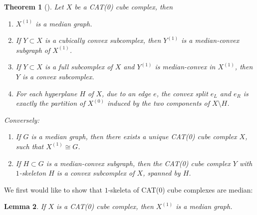 \documentclass[12pt, a4paper]{article}
\theoremstyle{plain}
\newtheorem{theorem}{Theorem}[section]
\newtheorem{lemma}[theorem]{Lemma}
\theoremstyle{definition}
\theoremstyle{remark}
\begin{document}
    \begin{theorem}[\cite{hagen}]
        Let $X$ be a CAT(0) cube complex, then
        
        \begin{enumerate}
            \item $X^{(1)}$ is a median graph.
            \item If $Y \subset X$ is a cubically convex subcomplex, then $Y^{(1)}$ is a median-convex subgraph of $X^{(1)}$.
            \item If $Y \subset X$ is a full subcomplex of $X$ and $Y^{(1)}$ is median-convex in $X^{(1)}$, then $Y$ is a convex subcomplex.
            \item For each hyperplane $H$ of $X$, due to an edge $e$, the convex split $e_{L}$ and $e_{R}$ is exactly the partition of $X^{(0)}$ induced by the two components of $X \setminus H$.
        \end{enumerate}
        
        Conversely:
        
        \begin{enumerate}
            \item If $G$ is a median graph, then there exists a unique CAT(0) cube complex $X$, such that $X^{(1)} \cong G$.
            \item If $H \subset G$ is a median-convex subgraph, then the CAT(0) cube complex $Y$ with $1$-skeleton $H$ is a convex subcomplex of $X$, spanned by $H$.
        \end{enumerate}
    \end{theorem}
    
    We first would like to show that $1$-skeleta of CAT(0) cube complexes are median:
    
    \begin{lemma}
        If $X$ is a CAT(0) cube complex, then $X^{(1)}$ is a median graph.
    \end{lemma}
    
\end{document}
